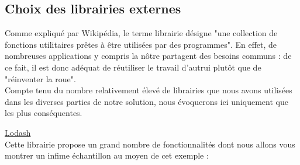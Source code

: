 \subsection*{Choix des librairies externes}

Comme expliqué par Wikipédia\cite{libraryDef}, le terme librairie désigne "une collection de fonctions utilitaires prêtes à être utilisées par des programmes". En effet, de nombreuses applications y compris la nôtre partagent des besoins communs : de ce fait, il est donc adéquat de réutiliser le travail d'autrui plutôt que de "réinventer la roue". \\

Compte tenu du nombre relativement élevé de librairies que nous avons utilisées dans les diverses parties de notre solution, nous évoquerons ici uniquement que les plus conséquentes. \\







\underline{\href{https://lodash.com/}{Lodash}}\\

Cette librairie propose un grand nombre de fonctionnalités dont nous allons vous montrer un infime échantillon au moyen de cet exemple :



